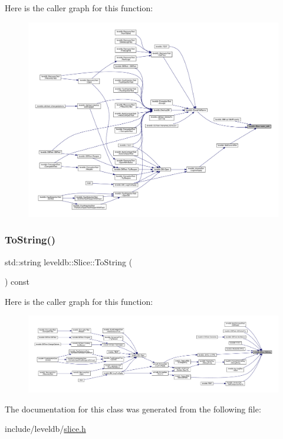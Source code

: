 Here is the caller graph for this function\+:
\nopagebreak
\begin{figure}[H]
\begin{center}
\leavevmode
\includegraphics[width=350pt]{classleveldb_1_1_slice_ae1c0a7f51a18a83bbeebfb300bf23767_icgraph}
\end{center}
\end{figure}
\mbox{\label{classleveldb_1_1_slice_a10ab05e2c2358bb6e6b6d49bf69d72ce}} 
\subsubsection{\texorpdfstring{ToString()}{ToString()}}
{\footnotesize\ttfamily std\+::string leveldb\+::\+Slice\+::\+To\+String (\begin{DoxyParamCaption}{ }\end{DoxyParamCaption}) const\hspace{0.3cm}{\ttfamily [inline]}}

Here is the caller graph for this function\+:
\nopagebreak
\begin{figure}[H]
\begin{center}
\leavevmode
\includegraphics[width=350pt]{classleveldb_1_1_slice_a10ab05e2c2358bb6e6b6d49bf69d72ce_icgraph}
\end{center}
\end{figure}


The documentation for this class was generated from the following file\+:\begin{DoxyCompactItemize}
\item 
include/leveldb/\mbox{\hyperlink{slice_8h}{slice.\+h}}\end{DoxyCompactItemize}
